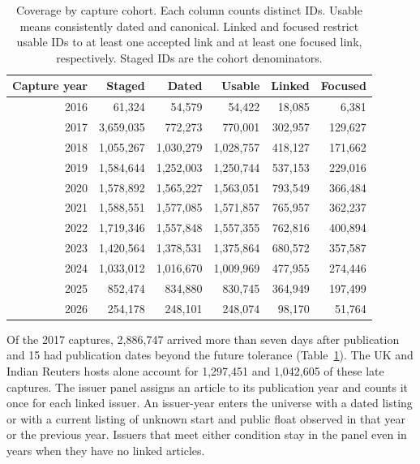 \begin{table}[t]
  \centering
  \small
  \caption{Coverage by capture cohort. Each column counts distinct IDs.
    Usable means consistently dated and canonical. Linked and focused
    restrict usable IDs to at least one accepted link and at least one
  focused link, respectively. Staged IDs are the cohort denominators.}
  \label{tab:app-coverage}
  \begin{tabular}{rrrrrr}
    \toprule
    Capture year & Staged & Dated & Usable & Linked & Focused \\
    \midrule
    2016 & 61,324 & 54,579 & 54,422 & 18,085 & 6,381 \\
    2017 & 3,659,035 & 772,273 & 770,001 & 302,957 & 129,627 \\
    2018 & 1,055,267 & 1,030,279 & 1,028,757 & 418,127 & 171,662 \\
    2019 & 1,584,644 & 1,252,003 & 1,250,744 & 537,153 & 229,016 \\
    2020 & 1,578,892 & 1,565,227 & 1,563,051 & 793,549 & 366,484 \\
    2021 & 1,588,551 & 1,577,085 & 1,571,857 & 765,957 & 362,237 \\
    2022 & 1,719,346 & 1,557,848 & 1,557,355 & 762,816 & 400,894 \\
    2023 & 1,420,564 & 1,378,531 & 1,375,864 & 680,572 & 357,587 \\
    2024 & 1,033,012 & 1,016,670 & 1,009,969 & 477,955 & 274,446 \\
    2025 & 852,474 & 834,880 & 830,745 & 364,949 & 197,499 \\
    2026 & 254,178 & 248,101 & 248,074 & 98,170 & 51,764 \\
    \bottomrule
  \end{tabular}
\end{table}

Of the 2017 captures, 2,886,747 arrived more than seven days after
publication and 15 had publication dates beyond the future tolerance
(Table~\ref{tab:app-coverage}). The UK and Indian Reuters hosts alone
account for 1,297,451 and 1,042,605 of these late captures. The
issuer panel assigns
an article to its publication year and counts it once for each linked
issuer. An issuer-year enters the universe with a dated listing or with
a current listing of unknown start and public float observed in that
year or the previous year. Issuers that meet either condition stay in
the panel even in years
when they have no linked articles.

